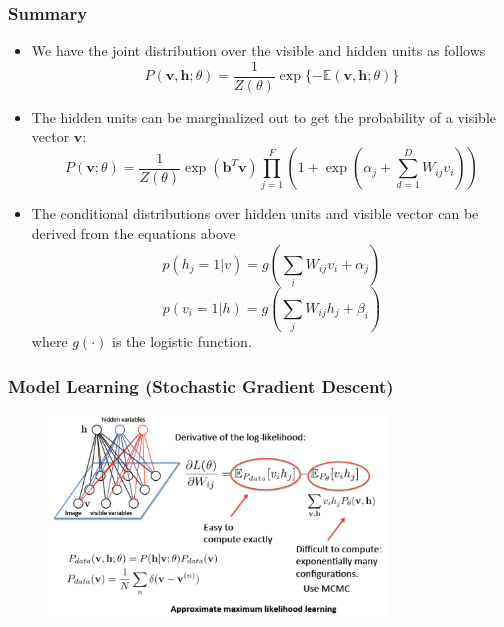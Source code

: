 \documentclass{beamer}
\begin{document}
\begin{frame}
\frametitle{Summary}
\begin{itemize}
\item We have the joint distribution over the visible and hidden units as follows
\begin{equation}
P(\mathbf{v, h}; \theta) = \frac{1}{Z(\theta)}\exp\{-\mathbb{E}(\mathbf{v, h}; \theta)\}
\end{equation}
\item The hidden units can be marginalized out to get the probability of a visible vector $\mathbf{v}$:
\begin{equation}
P(\mathbf{v}; \theta)=\frac{1}{Z(\theta)}\exp(\mathbf{b}^T\mathbf{v})\prod_{j=1}^{F}(1+\exp(\alpha_j+\sum_{d=1}^{D}W_{ij}v_i))
\end{equation}
\item The conditional distributions over hidden units and visible vector can be derived from the equations above
\begin{equation}
p(h_j=1|v) = g(\sum_i W_{ij}v_i+\alpha_j)
\end{equation}
\begin{equation}
p(v_i=1|h) = g(\sum_j W_{ij}h_j+\beta_i)
\end{equation}
\noindent where $g(\cdot)$ is the logistic function.
\end{itemize}
\end{frame}


\begin{frame}
\frametitle{Model Learning (Stochastic Gradient Descent)}
\begin{figure}
\centering
  \includegraphics[width=0.8\textwidth]{figs/rbm_estimate.png}
\end{figure}
\end{frame}
\end{document}
